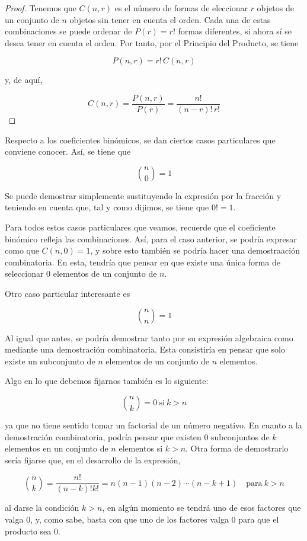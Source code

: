 \begin{proof}
  Tenemos que $C(n, r)$ es el número de formas de eleccionar $r$ objetos de
  un conjunto de $n$ objetos sin tener en cuenta el orden. Cada una de estas
  combinaciones se puede ordenar de $P(r) = r!$ formas diferentes, si ahora
  sí se desea tener en cuenta el orden. Por tanto, por el Principio del
  Producto, se tiene

  $$ P(n, r) = r! \, C(n, r) $$

  \noindent y, de aquí,

  $$ C(n, r) = \frac{P(n, r)}{P(r)} = \frac{n!}{(n-r)! \, r!} $$
\end{proof}

Respecto a los coeficientes binómicos, se dan ciertos casos particulares que
conviene conocer. Así, se tiene que

$$ {n \choose 0} = 1 $$

Se puede demostrar simplemente sustituyendo la expresión por la fracción y
teniendo en cuenta que, tal y como dijimos, se tiene que $0! = 1$.

Para todos estos casos particulares que veamos, recuerde que el coeficiente
binómico refleja las combinaciones. Así, para el caso anterior, se podría
expresar como que $C(n, 0) = 1$, y sobre esto también se podría hacer una
demostraación combinatoria. En esta, tendría que pensar en que existe una
única forma de seleccionar 0 elementos de un conjunto de $n$.

Otro caso particular interesante es

$$ {n \choose n} = 1 $$

Al igual que antes, se podría demostrar tanto por su expresión algebraica
como mediante una demostración combinatoria. Esta consistiría en pensar que
solo existe un subconjunto de $n$ elementos de un conjunto de $n$ elementos.

Algo en lo que debemos fijarnos también es lo siguiente:

$$ {n \choose k} = 0 \ \text{si} \ k >n $$

\noindent ya que no tiene sentido tomar un factorial de un número negativo.
En cuanto a la demostración combinatoria, podría pensar que existen 0
subconjuntos de $k$ elementos en un conjunto de $n$ elementos si $k > n$.
Otra forma de demostrarlo sería fijarse que, en el desarrollo de la
expresión,

$$ {n \choose k} = \frac{n!}{(n-k)! k!} = n(n-1)(n-2) \cdots (n - k + 1)
\quad \text{para} \ k > n $$

\noindent al darse la condición $k > n$, en algún momento se tendrá uno de
esos factores que valga 0, y, como sabe, basta con que uno de los factores
valga 0 para que el producto sea 0.

